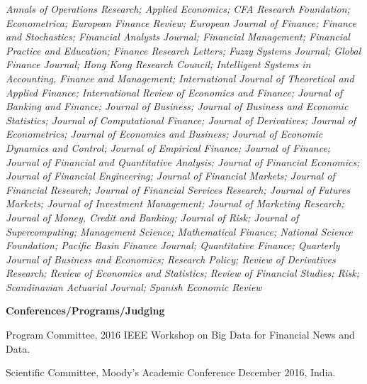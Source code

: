 \documentclass{article}
\begin{document}
\begin{description}
{\it 
Annals of Operations Research; 
Applied Economics; 
CFA Research Foundation; 
Econometrica; 
European Finance Review; 
European Journal of Finance; 
Finance and Stochastics; 
Financial Analysts Journal; 
Financial Management; 
Financial Practice and Education; 
Finance Research Letters; 
Fuzzy Systems Journal; 
Global Finance Journal; 
Hong Kong Research Council; 
Intelligent Systems in Accounting, Finance and Management; 
International Journal of Theoretical and Applied Finance; 
International Review of Economics and Finance; 
Journal of Banking and Finance; 
Journal of Business; 
Journal of Business and Economic Statistics; 
Journal of Computational Finance; 
Journal of Derivatives; 
Journal of Econometrics; 
Journal of Economics and Business; 
Journal of Economic Dynamics and Control; 
Journal of Empirical Finance; 
Journal of Finance; 
Journal of Financial and Quantitative Analysis; 
Journal of Financial Economics; 
Journal of Financial Engineering; 
Journal of Financial Markets; 
Journal of Financial Research; 
Journal of Financial Services Research; 
Journal of Futures Markets; 
Journal of Investment Management; 
Journal of Marketing Research; 
Journal of Money, Credit and Banking; 
Journal of Risk; 
Journal of Supercomputing; 
Management Science; 
Mathematical Finance; 
National Science Foundation; 
Pacific Basin Finance Journal; 
Quantitative Finance; 
Quarterly Journal of Business and Economics; 
Research Policy; 
Review of Derivatives Research; 
Review of Economics and Statistics; 
Review of Financial Studies; 
Risk; 
Scandinavian Actuarial Journal; 
Spanish Economic Review
}

%

\item {\bf Conferences/Programs/Judging}

\begin{etaremune}
\setlength\itemsep{-0.3em}

\item Program Committee, 2016 IEEE Workshop on Big Data for Financial News and Data.

\item Scientific Committee, Moody's Academic Conference December 2016, India. 


\end{etaremune}
\end{description}
\end{document}
